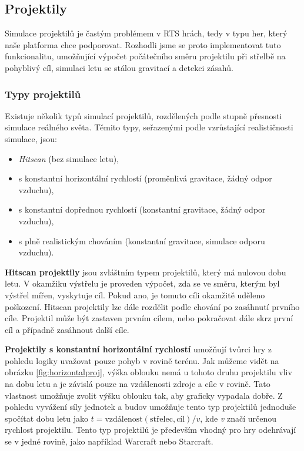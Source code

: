 \subsection{Projektily}
Simulace projektilů je častým problémem v RTS hrách, tedy v typu her, který naše platforma chce podporovat. Rozhodli jsme se proto implementovat tuto funkcionalitu, umožňující výpočet počátečního směru projektilu při střelbě na pohyblivý cíl, simulaci letu se stálou gravitací a detekci zásahů. 

\subsubsection{Typy projektilů}
Existuje několik typů simulací projektilů, rozdělených podle stupně přesnosti simulace reálného světa. Těmito typy, seřazenými podle vzrůstající realističnosti simulace, jsou:
\begin{itemize}
	\item \textit{Hitscan} (bez simulace letu),
	\item s konstantní horizontální rychlostí (proměnlivá gravitace, žádný odpor vzduchu),
	\item s konstantní dopřednou rychlostí (konstantní gravitace, žádný odpor vzduchu),
	\item s plně realistickým chováním (konstantní gravitace, simulace odporu vzduchu).
\end{itemize}

\textbf{Hitscan projektily} jsou zvláštním typem projektilů, který má nulovou dobu letu. V okamžiku výstřelu je proveden výpočet, zda se ve směru, kterým byl výstřel mířen, vyskytuje cíl. Pokud ano, je tomuto cíli okamžitě uděleno poškození. Hitscan projektily lze dále rozdělit podle chování po zasáhnutí prvního cíle. Projektil může být zastaven prvním cílem, nebo pokračovat dále skrz první cíl a případně zasáhnout další cíle.

\textbf{Projektily s konstantní horizontální rychlostí} umožňují tvůrci hry z pohledu logiky uvažovat pouze pohyb v rovině terénu. Jak můžeme vidět na obrázku \ref{fig:horizontalproj}, výška oblouku nemá u tohoto druhu projektilu vliv na dobu letu a je závislá pouze na vzdálenosti zdroje a cíle v rovině. Tato vlastnost umožňuje zvolit výšku oblouku tak, aby graficky vypadala dobře. Z pohledu vyvážení síly jednotek a budov umožňuje tento typ projektilů jednoduše spočítat dobu letu jako \( t=\text{vzdálenost}(\text{střelec}, \text{cíl}) / v \), kde \textit{v} značí určenou rychlost projektilu. Tento typ projektilů je především vhodný pro hry odehrávají se v jedné rovině, jako například Warcraft nebo Starcraft.

